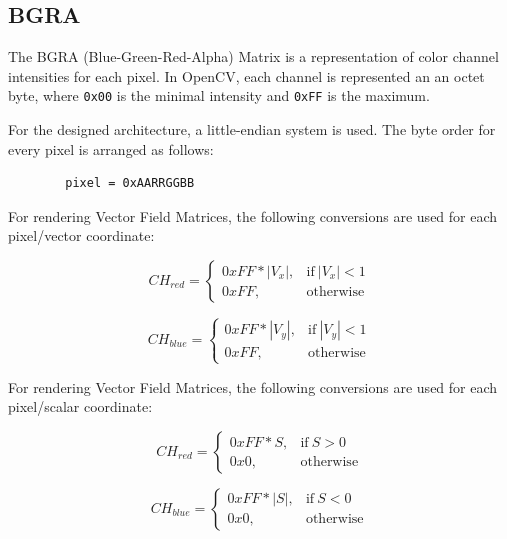 \documentclass[
10pt, %
letterpaper, %
oneside, %
headinclude,footinclude, %
BCOR5mm, %
]{scrartcl}
\begin{document}
\subsection{BGRA}
The BGRA (Blue-Green-Red-Alpha) Matrix is a representation of color channel intensities for each pixel. In OpenCV, each channel is represented
an an octet byte, where \verb|0x00| is the minimal intensity and \verb|0xFF| is the maximum.

For the designed architecture, a little-endian system is used. The byte order for every pixel is arranged as follows:
\begin{center}
    \begin{verbatim}
        pixel = 0xAARRGGBB
    \end{verbatim}
\end{center}

For rendering Vector Field Matrices, the following conversions are used for each pixel/vector coordinate:

\begin{equation}
    CH_{red} = \begin{cases}
        0xFF * |V_x|, & \text{if}\ |V_x| < 1 \\
        0xFF, & \text{otherwise}
    \end{cases}
\end{equation}

\begin{equation}
    CH_{blue} = \begin{cases}
        0xFF * |V_y|, & \text{if}\ |V_y| < 1 \\
        0xFF, & \text{otherwise}
    \end{cases}
\end{equation}

For rendering Vector Field Matrices, the following conversions are used for each pixel/scalar coordinate:

\begin{equation}
    CH_{red} = \begin{cases}
        0xFF * S, & \text{if}\ S > 0 \\
        0x0, & \text{otherwise}
    \end{cases}
\end{equation}

\begin{equation}
    CH_{blue} = \begin{cases}
        0xFF * |S|, & \text{if}\ S < 0 \\
        0x0, & \text{otherwise}
    \end{cases}
\end{equation}
\end{document}
